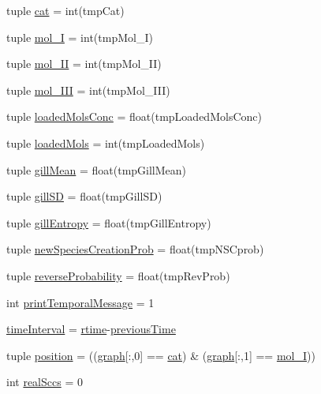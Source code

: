 \begin{DoxyCompactItemize}
\item 
tuple \hyperlink{a00102_aea872e34fe0da6302f6195f1b2315148}{cat} = int(tmp\-Cat)
\item 
tuple \hyperlink{a00102_ae13d6607ffa236891a9af05bfa88cfcc}{mol\-\_\-\-I} = int(tmp\-Mol\-\_\-\-I)
\item 
tuple \hyperlink{a00102_a8f2878f5909e4aeb9155a1103eaba413}{mol\-\_\-\-I\-I} = int(tmp\-Mol\-\_\-\-I\-I)
\item 
tuple \hyperlink{a00102_a20047e8516f386a7e98ffa0efec09471}{mol\-\_\-\-I\-I\-I} = int(tmp\-Mol\-\_\-\-I\-I\-I)
\item 
tuple \hyperlink{a00102_abe83f5e0ae3bd65da15a697a979aeea1}{loaded\-Mols\-Conc} = float(tmp\-Loaded\-Mols\-Conc)
\item 
tuple \hyperlink{a00102_ab4566d46d368eb4f93ff6db5191648bd}{loaded\-Mols} = int(tmp\-Loaded\-Mols)
\item 
tuple \hyperlink{a00102_a4e862896701636d17752f14810ff687f}{gill\-Mean} = float(tmp\-Gill\-Mean)
\item 
tuple \hyperlink{a00102_acdb3e72aea08c29494799fd08763b406}{gill\-S\-D} = float(tmp\-Gill\-S\-D)
\item 
tuple \hyperlink{a00102_a4c214eb4f6812d6182bae32715bce3ad}{gill\-Entropy} = float(tmp\-Gill\-Entropy)
\item 
tuple \hyperlink{a00102_a47b24df6e487f6dd90158dde93cc7c93}{new\-Species\-Creation\-Prob} = float(tmp\-N\-S\-Cprob)
\item 
tuple \hyperlink{a00102_aa7db2dba66810044f9c5238eccc995b7}{reverse\-Probability} = float(tmp\-Rev\-Prob)
\item 
int \hyperlink{a00102_a3de1ee32e24403b152d565d8c52cf7fd}{print\-Temporal\-Message} = 1
\item 
\hyperlink{a00102_a7d0f86310c439e970e0b41121364027c}{time\-Interval} = \hyperlink{a00102_a162a08b0497058c76e7e885c03a01336}{rtime}-\/\hyperlink{a00102_aff96a31e98ac46cb47a67b74f5d87351}{previous\-Time}
\item 
tuple \hyperlink{a00102_ac09e85f8df5b7c8c7d2caf87e9193421}{position} = ((\hyperlink{a00102_ab45392da38059bf7557c22cbc73e5580}{graph}\mbox{[}\-:,0\mbox{]} == \hyperlink{a00102_aea872e34fe0da6302f6195f1b2315148}{cat}) \& (\hyperlink{a00102_ab45392da38059bf7557c22cbc73e5580}{graph}\mbox{[}\-:,1\mbox{]} == \hyperlink{a00102_ae13d6607ffa236891a9af05bfa88cfcc}{mol\-\_\-\-I}))
\item 
int \hyperlink{a00102_ac6aaa0ac5d13b0736ab3179dc1ed388d}{real\-Sccs} = 0
\item 

\end{DoxyCompactItemize}
